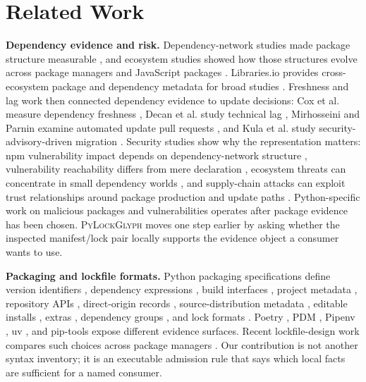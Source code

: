 \documentclass[10pt,conference]{IEEEtran}
\newcommand{\tool}{\textsc{PyLockGlyph}}
\begin{document}
\section{Related Work}
\textbf{Dependency evidence and risk.} Dependency-network studies made package structure measurable \cite{kikas2017structure}, and ecosystem studies showed how those structures evolve across package managers \cite{decan2019evolution} and JavaScript packages \cite{wittern2016dynamics}. Libraries.io provides cross-ecosystem package and dependency metadata for broad studies \cite{katz2020librariesio}. Freshness and lag work then connected dependency evidence to update decisions: Cox et al. measure dependency freshness \cite{cox2015freshness}, Decan et al. study technical lag \cite{decan2018lag}, Mirhosseini and Parnin examine automated update pull requests \cite{mirhosseini2017prs}, and Kula et al. study security-advisory-driven migration \cite{kula2018updates}. Security studies show why the representation matters: npm vulnerability impact depends on dependency-network structure \cite{decan2018npmsec}, vulnerability reachability differs from mere declaration \cite{pashchenko2022vuln4real}, ecosystem threats can concentrate in small dependency worlds \cite{zimmermann2019smallworld}, and supply-chain attacks can exploit trust relationships around package production and update paths \cite{ohm2020backstabber}. Python-specific work on malicious packages \cite{vu2023badsnakes} and vulnerabilities \cite{alfadel2023pythonvuln} operates after package evidence has been chosen. \tool{} moves one step earlier by asking whether the inspected manifest/lock pair locally supports the evidence object a consumer wants to use.

\textbf{Packaging and lockfile formats.} Python packaging specifications define version identifiers \cite{pep440}, dependency expressions \cite{pep508}, build interfaces \cite{pep517,pep518}, project metadata \cite{pep621}, repository APIs \cite{pep503,pep691}, direct-origin records \cite{pep610}, source-distribution metadata \cite{pep643}, editable installs \cite{pep660}, extras \cite{pep685}, dependency groups \cite{pep735}, and lock formats \cite{pep665,pep751,pypaPylock}. Poetry \cite{poetryDocs}, PDM \cite{pdmDocs}, Pipenv \cite{pipenvDocs}, uv \cite{uvDocs}, and pip-tools \cite{pipToolsDocs} expose different evidence surfaces. Recent lockfile-design work compares such choices across package managers \cite{gamage2025lockfiles}. Our contribution is not another syntax inventory; it is an executable admission rule that says which local facts are sufficient for a named consumer.
\end{document}
